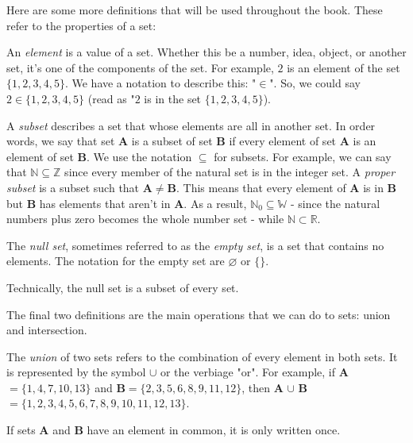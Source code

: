 \documentclass[../book.tex]{subfiles}
\begin{document}
Here are some more definitions that will be used throughout the book.  These refer to the properties of a set:

An \textit{element} is a value of a set.  Whether this be a number, idea, object, or another set, it's one of the components of the set.  For example, $2$ is an element of the set $\{1,2,3,4,5\}$.  We have a notation to describe this: "$\in$".  So, we could say $2\in\{1,2,3,4,5\}$ (read as "$2$ is in the set $\{1,2,3,4,5\}$).

A \textit{subset} describes a set that whose elements are all in another set.  In order words, we say that set \textbf{A} is a subset of set \textbf{B} if every element of set \textbf{A} is an element of set \textbf{B}.  We use the notation $\subseteq$ for subsets.  For example, we can say that $\mathbb{N}\subseteq\mathbb{Z}$ since every member of the natural set is in the integer set.  A \textit{proper subset} is a subset such that \textbf{A}$\neq$\textbf{B}.  This means that every element of \textbf{A} is in \textbf{B} but \textbf{B} has elements that aren't in \textbf{A}.  As a result, $\mathbb{N}_0\subseteq\mathbb{W}$ - since the natural numbers plus zero becomes the whole number set - while $\mathbb{N}\subset\mathbb{R}$.

The \textit{null set}, sometimes referred to as the \textit{empty set}, is a set that contains no elements.  The notation for the empty set are $\varnothing$ or $\{\}$.

\begin{remark}
  Technically, the null set is a subset of every set.
\end{remark}

The final two definitions are the main operations that we can do to sets: union and intersection.  

The \textit{union} of two sets refers to the combination of every element in both sets.  It is represented by the symbol $\cup$ or the verbiage "or".  For example, if \textbf{A}$=\{1,4,7,10,13\}$ and \textbf{B}$=\{2,3,5,6,8,9,11,12\}$, then \textbf{A} $\cup$ \textbf{B} $=\{1,2,3,4,5,6,7,8,9,10,11,12,13\}$.

\begin{remark}
  If sets \textbf{A} and \textbf{B} have an element in common, it is only written once.
\end{remark}
\end{document}
